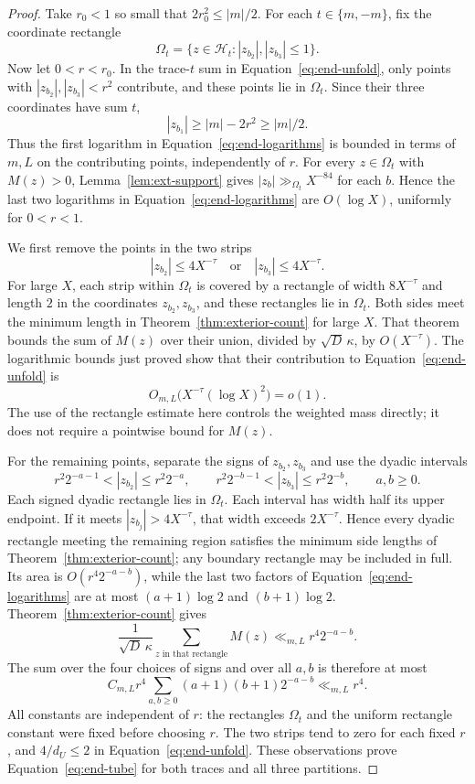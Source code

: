 \begin{proof}
Take $r_0<1$ so small that $2r_0^2\le |m|/2$.  For each
$t\in\{m,-m\}$, fix the coordinate rectangle
\[
 \Omega_t=\{z\in\mathcal H_t:|z_{b_2}|,|z_{b_3}|\le1\}.
\]
Now let $0<r<r_0$.  In the trace-$t$ sum in
Equation~\eqref{eq:end-unfold}, only points with
$|z_{b_2}|,|z_{b_3}|<r^2$ contribute, and these points lie in $\Omega_t$.
Since their three coordinates have sum $t$,
\[
 |z_{b_1}|\ge |m|-2r^2\ge |m|/2.
\]
Thus the first logarithm in Equation~\eqref{eq:end-logarithms} is bounded
in terms of $m,L$ on the contributing points, independently of $r$.
For every $z\in\Omega_t$ with $M(z)>0$, Lemma~\ref{lem:ext-support} gives
$|z_b|\gg_{\Omega_t}X^{-84}$ for each $b$.  Hence the last two logarithms
in Equation~\eqref{eq:end-logarithms} are $O(\log X)$, uniformly for
$0<r<1$.

We first remove the points in the two strips
\begin{equation}\label{eq:end-strips}
 |z_{b_2}|\le4X^{-\tau}
       \quad\text{or}\quad
 |z_{b_3}|\le4X^{-\tau}.
\end{equation}
For large $X$, each strip within $\Omega_t$ is covered by a rectangle
of width $8X^{-\tau}$ and length $2$ in the coordinates
$z_{b_2},z_{b_3}$, and these rectangles lie in $\Omega_t$.  Both sides
meet the minimum length in
Theorem~\ref{thm:exterior-count} for large $X$.  That theorem bounds the
sum of $M(z)$ over their union, divided by $\sqrt D\,\kappa$, by
$O(X^{-\tau})$.  The logarithmic bounds just proved show that their
contribution to Equation~\eqref{eq:end-unfold} is
\[
 O_{m,L}\bigl(X^{-\tau}(\log X)^2\bigr)=o(1).
\]
The use of the rectangle estimate here controls the weighted mass
directly; it does not require a pointwise bound for $M(z)$.

For the remaining points, separate the signs of $z_{b_2},z_{b_3}$ and
use the dyadic intervals
\[
 r^2 2^{-a-1}<|z_{b_2}|\le r^2 2^{-a},\qquad
 r^2 2^{-b-1}<|z_{b_3}|\le r^2 2^{-b},
 \qquad a,b\ge0.
\]
Each signed dyadic rectangle lies in $\Omega_t$.
Each interval has width half its upper endpoint.  If it meets
$|z_{b_j}|>4X^{-\tau}$, that width exceeds $2X^{-\tau}$.  Hence every
dyadic rectangle meeting the remaining region satisfies the minimum
side lengths of Theorem~\ref{thm:exterior-count}; any boundary rectangle
may be included in full.  Its area is $O(r^4 2^{-a-b})$, while the last
two factors of Equation~\eqref{eq:end-logarithms} are at most
$(a+1)\log2$ and $(b+1)\log2$.  Theorem~\ref{thm:exterior-count} gives
\[
 \frac1{\sqrt D\,\kappa}
   \sum_{z\text{ in that rectangle}} M(z)
       \ll_{m,L} r^4 2^{-a-b}.
\]
The sum over the four choices of signs and over all $a,b$ is therefore
at most
\[
 C_{m,L}r^4
       \sum_{a,b\ge0}(a+1)(b+1)2^{-a-b}
 \ll_{m,L}r^4.
\]
All constants are independent of $r$: the rectangles $\Omega_t$ and the
uniform rectangle constant were fixed before choosing $r$.  The two
strips tend to zero for each fixed $r$, and $4/d_U\le2$ in
Equation~\eqref{eq:end-unfold}.  These observations prove
Equation~\eqref{eq:end-tube} for both traces and all three partitions.
\end{proof}

